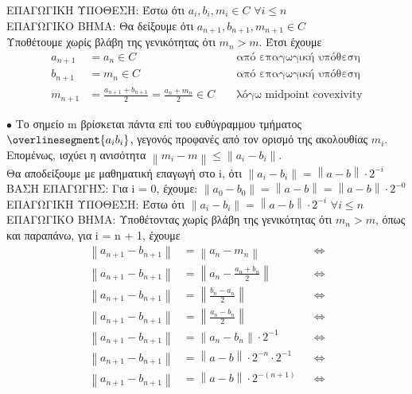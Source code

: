 \documentclass[12pt]{article}
\newcommand{\norm}[1]{\left\lVert#1\right\rVert}
\newcommand{\margin}{\hspace{4pt}}
\begin{document}
ΕΠΑΓΩΓΙΚΗ ΥΠΟΘΕΣΗ: Έστω ότι $a_i, b_i, m_i \in C \margin \forall i \leq n$ \\

ΕΠΑΓΩΓΙΚΟ ΒΗΜΑ: Θα δείξουμε ότι $a_{n + 1}, b_{n + 1}, m_{n + 1} \in C$ \\

Υποθέτουμε χωρίς βλάβη της γενικότητας ότι $m_n > m$. Έτσι έχουμε \\

\begin{align*}
    a_{n + 1} & = a_n \in C && \text{ από επαγωγική υπόθεση}\\
    b_{n + 1} & = m_n \in C && \text{ από επαγωγική υπόθεση} \\
    m_{n + 1} & = \frac{a_{n + 1} + b_{n + 1}}{2} = \frac{a_n + m_n}{2} \in C && \text{ λόγω midpoint covexivity}
\end{align*}

$\bullet$ Το σημείο m βρίσκεται πάντα επί του ευθύγραμμου τμήματος $\overlinesegment{a_{i}b_{i}}$,
γεγονός προφανές από τον ορισμό της ακολουθίας $m_i$.
Επομένως, ισχύει η ανισότητα $\norm{m_i - m} \leq \norm{a_i - b_i}$. \\

Θα αποδείξουμε με μαθηματική επαγωγή στο i, ότι $\norm{a_i - b_i} = \norm{a - b} \cdot 2^{-i}$\\

ΒΑΣΗ ΕΠΑΓΩΓΗΣ: Για i = 0, έχουμε: $\norm{a_0 - b_0} = \norm{a - b} = \norm{a - b} \cdot 2^{-0}$\\

ΕΠΑΓΩΓΙΚΗ ΥΠΟΘΕΣΗ: Έστω ότι $\norm{a_i - b_i} = \norm{a - b} \cdot 2^{-i} \margin \forall i \leq n$\\

ΕΠΑΓΩΓΙΚΟ ΒΗΜΑ: Υποθέτοντας χωρίς βλάβη της γενικότητας ότι $m_n > m$,
όπως και παραπάνω, για i = n + 1, έχουμε\\

\begin{align*}
    \norm{a_{n + 1} - b_{n + 1}} & = \norm{a_n - m_n} && \Leftrightarrow \\
    \norm{a_{n + 1} - b_{n + 1}} & = \norm{a_n - \frac{a_n + b_n}{2}} && \Leftrightarrow \\
    \norm{a_{n + 1} - b_{n + 1}} & = \norm{\frac{b_n - a_n}{2}} && \Leftrightarrow \\
    \norm{a_{n + 1} - b_{n + 1}} & = \norm{\frac{a_n - b_n}{2}} && \Leftrightarrow \\
    \norm{a_{n + 1} - b_{n + 1}} & = \norm{a_n - b_n} \cdot {2^{-1}} && \Leftrightarrow \\
    \norm{a_{n + 1} - b_{n + 1}} & = \norm{a - b} \cdot 2^{-n} \cdot {2^{-1}} && \Leftrightarrow \\
    \norm{a_{n + 1} - b_{n + 1}} & = \norm{a - b} \cdot 2^{-(n + 1)} && \Leftrightarrow
\end{align*}\\
\end{document}
